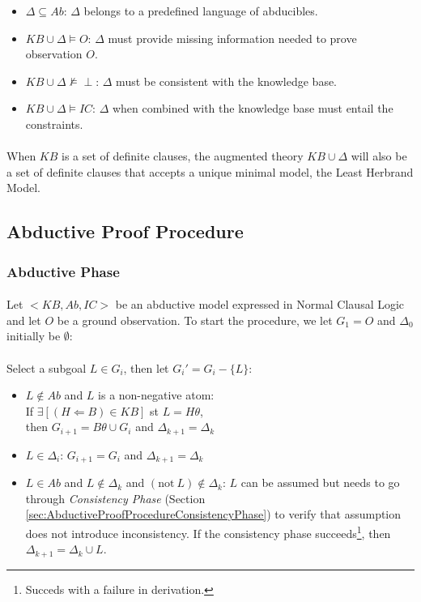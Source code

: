 \documentclass{article}
\theoremstyle{plain}
\theoremstyle{definition}
\begin{document}
\begin{multicols}{2}
\begin{itemize}
\item $\Delta \subseteq Ab$: $\Delta$ belongs to a predefined language of abducibles.
\item $KB \cup \Delta \models O$: $\Delta$ must provide missing information needed to prove observation $O$.
\item $KB \cup \Delta \not\models \perp$: $\Delta$ must be consistent with the knowledge base.
\item $KB \cup \Delta \models IC$: $\Delta$ when combined with the knowledge base must entail the constraints.
\end{itemize}

\paragraph{} When $KB$ is a set of definite clauses, the augmented theory $KB \cup \Delta$ will also be a set of definite clauses that accepts a unique minimal model, the Least Herbrand Model.

\subsection{Abductive Proof Procedure}

\subsubsection{Abductive Phase}\label{sec:AbductiveProofProcedureAbductivePhase}

\paragraph{} Let $<KB, Ab, IC>$ be an abductive model expressed in Normal Clausal Logic and let $O$ be a ground observation. To start the procedure, we let $G_1 = O$ and $\Delta_0$ initially be $\emptyset$:

\paragraph{} Select a subgoal $L \in G_i$, then let $G_i' = G_i - \{L\}$:
\begin{itemize}
\item $L \not\in Ab$ and $L$ is a non-negative atom:\\ If $\exists [(H \Leftarrow B) \in KB]$ st $L = H\theta$,\\ then $G_{i+1} = B\theta \cup G_i$ and $\Delta_{k+1} = \Delta_k$
\item $L \in \Delta_i$: $G_{i+1} = G_i$ and $\Delta_{k+1} = \Delta_k$
\item $L \in Ab$ and $L \not\in \Delta_k$ and $(\text{not}\ L) \not\in \Delta_k$: $L$ can be assumed but needs to go through \textit{Consistency Phase} (Section \ref{sec:AbductiveProofProcedureConsistencyPhase}) to verify that assumption does not introduce inconsistency. If the consistency phase succeeds\footnote{Succeds with a failure in derivation.}, then $\Delta_{k+1} = \Delta_k \cup {L}$.
\end{itemize}


\end{multicols}
\end{document}
